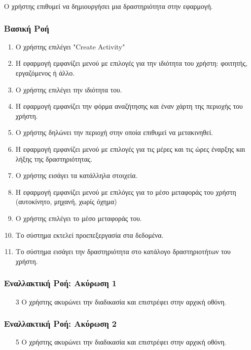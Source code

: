 \documentclass[11pt]{article}
\begin{document}
Ο χρήστης επιθυμεί να δημιουργήσει μια δραστηριότητα στην εφαρμογή.

\subsubsection{Βασική Ροή}

\begin{enumerate}
    \item Ο χρήστης επιλέγει "Create Activity"
    \item Η εφαρμογή εμφανίζει μενού με επιλογές για την ιδιότητα του χρήστη:
          φοιτητής, εργαζόμενος ή άλλο.
    \item Ο χρήστης επιλέγει την ιδιότητα του.
    \item Η εφαρμογή εμφανίζει την φόρμα αναζήτησης και έναν χάρτη της περιοχής του χρήστη.
    \item Ο χρήστης δηλώνει την περιοχή στην οποία επιθυμεί να μετακινηθεί.
    \item Η εφαρμογή εμφανίζει μενού με επιλογές για τις μέρες και τις ώρες έναρξης και λήξης
          της δραστηριότητας.
    \item Ο χρήστης εισάγει τα κατάλληλα στοιχεία.
    \item H εφαρμογή εμφανίζει μενού με επιλόγες για το μέσο μεταφοράς του χρήστη
          (αυτοκίνητο, μηχανή, χωρίς όχημα)
    \item Ο χρήστης επιλέγει το μέσο μεταφοράς του.
    \item Το σύστημα εκτελεί προεπεξεργασία στα δεδομένα.
    \item Το σύστημα εισάγει την δραστηριότητα στο κατάλογο δραστηριοτήτων του χρήστη.
\end{enumerate}

\subsubsection{Εναλλακτική Ροή: Ακύρωση 1}

\begin{enumerate}
    \item[3] Ο χρήστης ακυρώνει την διαδικασία και επιστρέφει στην αρχική οθόνη.
\end{enumerate}

\subsubsection{Εναλλακτική Ροή: Ακύρωση 2}

\begin{enumerate}
    \item[5] Ο χρήστης ακυρώνει την διαδικασία και επιστρέφει στην αρχική οθόνη.
\end{enumerate}
\end{document}

